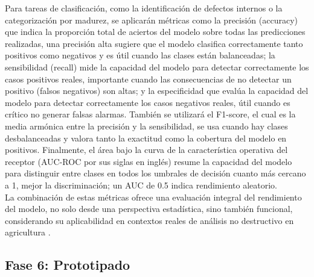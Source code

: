Para tareas de clasificación, como la identificación de defectos internos o la categorización por madurez, se aplicarán métricas como la precisión (accuracy) que indica la proporción total de aciertos del modelo sobre todas las predicciones realizadas, una precisión alta sugiere que el modelo clasifica correctamente tanto positivos como negativos y es útil cuando las clases están balanceadas; la sensibilidad (recall) mide la capacidad del modelo para detectar correctamente los casos positivos reales, importante cuando las consecuencias de no detectar un positivo (falsos negativos) son altas; y la especificidad que evalúa la capacidad del modelo para detectar correctamente los casos negativos reales, útil cuando es crítico no generar falsas alarmas. También se utilizará el F1-score, el cual es la media armónica entre la precisión y la sensibilidad, se usa cuando hay clases desbalanceadas y valora tanto la exactitud como la cobertura del modelo en positivos. Finalmente, el área bajo la curva de la característica operativa del receptor (AUC-ROC por sus siglas en inglés) resume la capacidad del modelo para distinguir entre clases en todos los umbrales de decisión cuanto más cercano a 1, mejor la discriminación; un AUC de 0.5 indica rendimiento aleatorio.\\

La combinación de estas métricas ofrece una evaluación integral del rendimiento del modelo, no solo desde una perspectiva estadística, sino también funcional, considerando su aplicabilidad en contextos reales de análisis no destructivo en agricultura \parencite{chlingaryan_machine_2018}.


\subsection{Fase 6: Prototipado}

